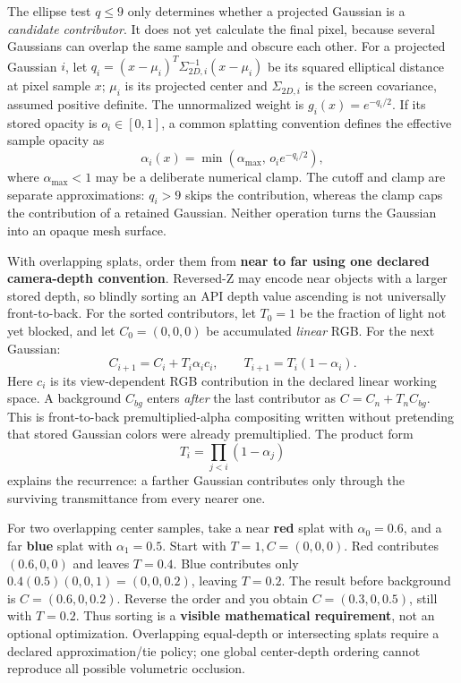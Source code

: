 The ellipse test \(q\leq9\) only determines whether a projected Gaussian is a \emph{candidate contributor}. It does not yet calculate the final pixel, because several Gaussians can overlap the same sample and obscure each other. For a projected Gaussian \(i\), let \(q_i=(x-\mu_i)^T\Sigma_{2D,i}^{-1}(x-\mu_i)\) be its squared elliptical distance at pixel sample \(x\); \(\mu_i\) is its projected center and \(\Sigma_{2D,i}\) is the screen covariance, assumed positive definite. The unnormalized weight is \(g_i(x)=e^{-q_i/2}\). If its stored opacity is \(o_i\in[0,1]\), a common splatting convention defines the effective sample opacity as \[
\alpha_i(x)=\min(\alpha_{\max},\,o_i e^{-q_i/2}),
\] where \(\alpha_{\max}<1\) may be a deliberate numerical clamp. The cutoff and clamp are separate approximations: \(q_i>9\) skips the contribution, whereas the clamp caps the contribution of a retained Gaussian. Neither operation turns the Gaussian into an opaque mesh surface.

With overlapping splats, order them from \textbf{near to far using one declared camera-depth convention}. Reversed-Z may encode near objects with a larger stored depth, so blindly sorting an API depth value ascending is not universally front-to-back. For the sorted contributors, let \(T_0=1\) be the fraction of light not yet blocked, and let \(C_0=(0,0,0)\) be accumulated \emph{linear} RGB. For the next Gaussian: \[
C_{i+1}=C_i+T_i\alpha_i c_i,\qquad
T_{i+1}=T_i(1-\alpha_i).
\] Here \(c_i\) is its view-dependent RGB contribution in the declared linear working space. A background \(C_{bg}\) enters \emph{after} the last contributor as \(C=C_n+T_n C_{bg}\). This is front-to-back premultiplied-alpha compositing written without pretending that stored Gaussian colors were already premultiplied. The product form \[
T_i=\prod_{j<i}(1-\alpha_j)
\] explains the recurrence: a farther Gaussian contributes only through the surviving transmittance from every nearer one.

For two overlapping center samples, take a near \textbf{red} splat with \(\alpha_0=0.6\), and a far \textbf{blue} splat with \(\alpha_1=0.5\). Start with \(T=1,C=(0,0,0)\). Red contributes \((0.6,0,0)\) and leaves \(T=0.4\). Blue contributes only \(0.4(0.5)(0,0,1)=(0,0,0.2)\), leaving \(T=0.2\). The result before background is \(C=(0.6,0,0.2)\). Reverse the order and you obtain \(C=(0.3,0,0.5)\), still with \(T=0.2\). Thus sorting is a \textbf{visible mathematical requirement}, not an optional optimization. Overlapping equal-depth or intersecting splats require a declared approximation/tie policy; one global center-depth ordering cannot reproduce all possible volumetric occlusion.

